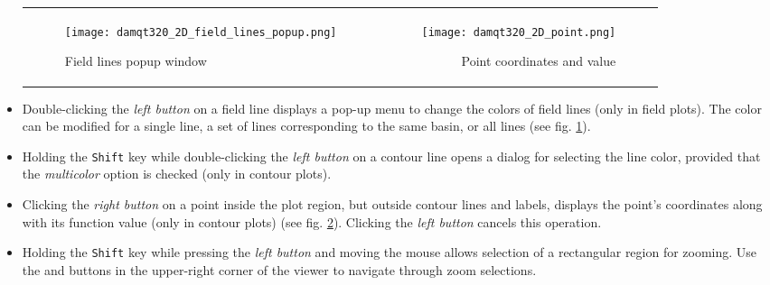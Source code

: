 \documentclass[10pt]{article}
\begin{document}
\begin{itemize}
\hspace*{-5mm}
\begin{tabular}{lr}
\begin{minipage}{.5\linewidth}
    \begin{figure}[H]
        \begin{center}
            \texttt{[image: damqt320\_2D\_field\_lines\_popup.png]}
        \end{center}
        \vspace*{-1mm}
        \caption{Field lines popup window \label{fig:3_12b}}
    \end{figure}
\end{minipage}
&
\begin{minipage}{.5\linewidth}
    \begin{figure}[H]
        \begin{center}
            \texttt{[image: damqt320\_2D\_point.png]}
        \end{center}
        \vspace*{-1mm}
        \caption{Point coordinates and value \label{fig:3_13}}
    \end{figure}
\end{minipage}
\end{tabular}

\vspace{1cm}

\item Double-clicking the {\it left button} on a field line displays a pop-up menu  
to change the colors of field lines (only in field plots).  
The color can be modified for a single line, a set of lines corresponding to the same basin,  
or all lines (see fig. \ref{fig:3_12b}).  

\item Holding the \texttt{Shift} key while double-clicking the {\it left button} on a contour line  
opens a dialog for selecting the line color, provided that the {\it multicolor}  
 option is checked (only in contour plots).  

\item Clicking the {\it right button} on a point inside the plot region,  
but outside contour lines and labels,  
displays the point's coordinates along with its function value (only in contour plots)  
(see fig. \ref{fig:3_13}). Clicking the {\it left button} cancels this operation.  

\item Holding the \texttt{Shift} key while pressing the {\it left button} and moving the mouse  
allows selection of a rectangular region for zooming.  
Use the \zoomin{} and \zoomout{}  
buttons in the upper-right corner of the viewer to navigate through zoom selections.  

\end{itemize}
\end{document}

